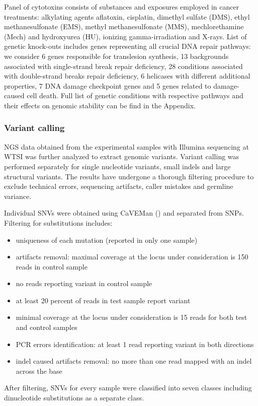Panel of cytotoxins consists of substances and exposures employed in cancer treatments: alkylating agents aflatoxin, cisplatin, dimethyl sulfate (DMS), ethyl methanesulfonate (EMS), methyl methanesulfonate (MMS), mechlorethamine (Mech) and hydroxyurea (HU), ionizing gamma-irradiation and X-rays.
List of genetic knock-outs includes genes representing all crucial DNA repair pathways: we consider 6 genes responsible for translesion synthesis, 13 backgrounds associated with single-strand break repair deficiency, 28 conditions associated with double-strand breaks repair deficiency, 6 helicases with different additional properties, 7 DNA damage checkpoint genes and 5 genes related to damage-caused cell death.
Full list of genetic conditions with respective pathways and their effects on genomic stability can be find in the Appendix.


\subsubsection*{Variant calling}

NGS data obtained from the experimental samples with Illumina sequencing at WTSI was further analyzed to extract genomic variants. Variant calling was performed separately for single nucleotide variants, small indels and large structural variants. The results have undergone a thorough filtering procedure to exclude technical errors, sequencing artifacts, caller mistakes and germline variance.

Individual SNVs were obtained using CaVEMan (\cite{caveman}) and separated from SNPs. Filtering for substitutions includes:
\begin{itemize}
\itemsep0em
\item uniqueness of each mutation (reported in only one sample)
\item artifacts removal: maximal coverage at the locus under consideration is 150 reads in control sample
\item no reads reporting variant in control sample
\item at least 20 percent of reads in test sample report variant
\item minimal coverage at the locus under consideration is 15 reads for both test and control samples
\item PCR errors identification: at least 1 read reporting variant in both directions
\item indel caused artifacts removal: no more than one read mapped with an indel across the base
\end{itemize}
After filtering, SNVs for every sample were classified into seven classes including dinucleotide substitutions as a separate class.


